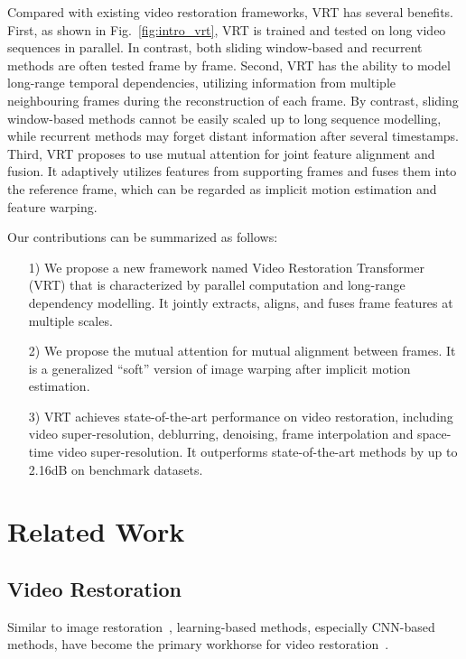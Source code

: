 \documentclass[10pt,twocolumn,letterpaper]{article}
\newlength \g
\begin{document}
Compared with existing video restoration frameworks, VRT has several benefits. First, as shown in Fig.~\ref{fig:intro_vrt}, VRT is trained and tested on long video sequences in parallel. In contrast, both sliding window-based and recurrent methods are often tested frame by frame. Second, VRT has the ability to model long-range temporal dependencies, utilizing information from multiple neighbouring frames during the reconstruction of each frame. By contrast, sliding window-based methods cannot be easily scaled up to long sequence modelling, while recurrent methods may forget distant information after several timestamps. Third, VRT proposes to use mutual attention for joint feature alignment and fusion. It adaptively utilizes features from supporting frames and fuses them into the reference frame, which can be regarded as implicit motion estimation and feature warping. 

Our contributions can be summarized as follows:
\begin{itemize}
  \vspace{-0.2cm}
  \item[1)] We propose a new framework named Video Restoration Transformer (VRT) that is characterized by parallel computation and long-range dependency modelling. It jointly extracts, aligns, and fuses frame features at multiple scales.
  \vspace{-0.2cm}
  \item[2)] We propose the mutual attention for mutual alignment between frames. It is a generalized ``soft'' version of image warping after implicit motion estimation.
  \vspace{-0.2cm}
  \item[3)] VRT achieves state-of-the-art performance on video restoration, including video super-resolution, deblurring, denoising, frame interpolation and space-time video super-resolution. It outperforms state-of-the-art methods by up to 2.16dB on benchmark datasets.
\end{itemize}


\section{Related Work}
\subsection{Video Restoration}
Similar to image restoration~\cite{dong2014srcnn, zhang2017DnCNN, ledig2017srresnet, fan2017balanced, liu2018NLRN, yu2018wide, zhang2018RDN, zhang2018srmd, zhang2018rcan,zhang2019RNAN, wang2019learning,mei2020CSNLN, guo2020drn,fan2020scale, liang2021fkp, xiang2021boosting, liang21manet, mei2021NLSA, liang21hcflow, wang2021unsupervised, wang2021learning,kai2021bsrgan, li2021beginner, zhang2021DPIR, sun2021mefnet, liang21swinir}, learning-based methods, especially CNN-based methods, have become the primary workhorse for video restoration~\cite{liu2018learning, wang2019edvr, zhou2019spatio, yi2019pfnl_udm, xiang2020deep, xiang2020zooming, pan2020tspdeblur, wang2020deep, pan2020cascaded, yi2021omniscient, chan2021basicvsr, maggioni2021efficient, vaksman2021patch, lee2021restore, yang2021ntire}. 
\end{document}
